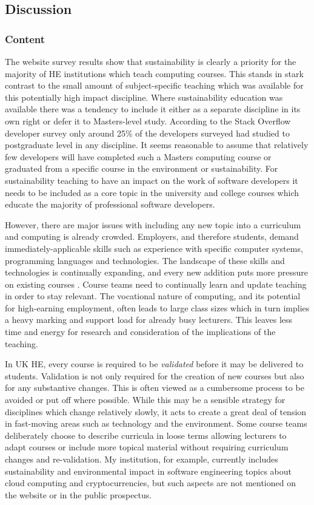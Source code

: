 \subsection*{Discussion}

\subsubsection*{Content}

The website survey results show that sustainability is clearly a priority for the majority of HE institutions which teach computing courses. This stands in stark contrast to the small amount of subject-specific teaching which was available for this potentially high impact discipline. Where sustainability education was available there was a tendency to include it either as a separate discipline in its own right or defer it to Masters-level study. According to the Stack Overflow developer survey \citep{StackOverflow2022} only around 25\% of the developers surveyed had studied to postgraduate level in any discipline. It seems reasonable to assume that relatively few developers will have completed such a Masters computing course or graduated from a specific course in the environment or sustainability. For sustainability teaching to have an impact on the work of software developers it needs to be included as a core topic in the university and college courses which educate the majority of professional software developers.

However, there are major issues with including any new topic into a curriculum \citep{Annala2017} and computing is already crowded. Employers, and therefore students, demand immediately-applicable skills such as experience with specific computer systems, programming languages and technologies. The landscape of these skills and technologies is continually expanding, and every new addition puts more pressure on existing courses \citep{Vessey2005}. Course teams need to continually learn and update teaching in order to stay relevant. The vocational nature of computing, and its potential for high-earning employment, often leads to large class sizes which in turn implies a heavy marking and support load for already busy lecturers. This leaves less time and energy for research and consideration of the implications of the teaching.

In UK HE, every course is required to be \emph{validated} before it may be delivered to students. Validation is not only required for the creation of new courses but also for any substantive changes. This is often viewed as a cumbersome process to be avoided or put off where possible. While this may be a sensible strategy for disciplines which change relatively slowly, it acts to create a great deal of tension in fast-moving areas such as technology and the environment. Some course teams deliberately choose to describe curricula in loose terms allowing lecturers to adapt courses or include more topical material without requiring curriculum changes and re-validation. My institution, for example, currently includes sustainability and environmental impact in software engineering topics about cloud computing and cryptocurrencies, but such aspects are not mentioned on the website or in the public prospectus.

